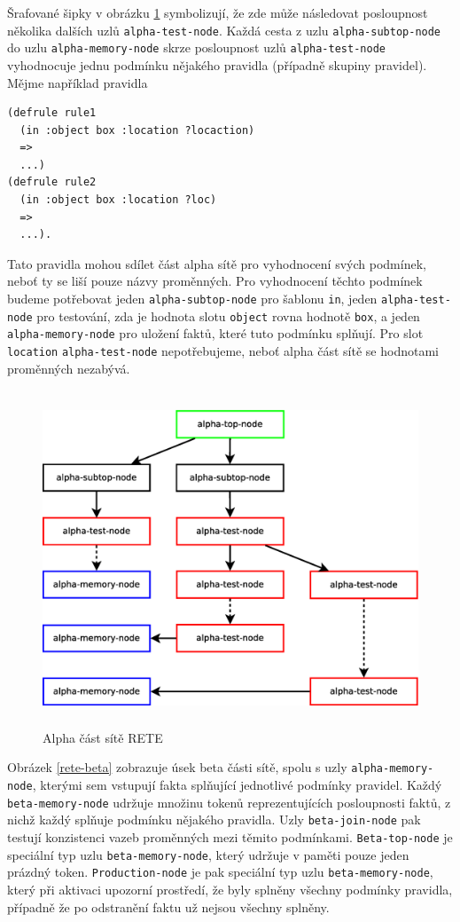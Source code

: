 Šrafované šipky v obrázku \ref{rete-alpha} symbolizují, že zde může následovat
posloupnost několika dalších uzlů \verb|alpha-test-node|. Každá cesta z
uzlu \verb|alpha-subtop-node| do uzlu \verb|alpha-memory-node| skrze posloupnost
uzlů \verb|alpha-test-node| vyhodnocuje jednu podmínku nějakého pravidla (případně
skupiny pravidel). Mějme například pravidla
\begin{verbatim}
(defrule rule1
  (in :object box :location ?locaction)
  =>
  ...)
(defrule rule2
  (in :object box :location ?loc)
  =>
  ...).
\end{verbatim}
Tato pravidla mohou sdílet část alpha sítě pro vyhodnocení svých podmínek, neboť
ty se liší pouze názvy proměnných. Pro vyhodnocení těchto podmínek budeme
potřebovat jeden \verb|alpha-subtop-node| pro šablonu \verb|in|, jeden
\verb|alpha-test-node| pro testování, zda je hodnota slotu \verb|object| rovna
hodnotě \verb|box|, a jeden \verb|alpha-memory-node| pro uložení faktů, které
tuto podmínku splňují. Pro slot \verb|location| \verb|alpha-test-node|
nepotřebujeme, neboť alpha část sítě se hodnotami proměnných nezabývá.

\begin{figure}[h]
\centering
\includegraphics[height=10cm]{rete-alpha.eps}
\caption{Alpha část sítě RETE}
\label{rete-alpha}
\end{figure}

Obrázek \ref{rete-beta} zobrazuje úsek beta části sítě, spolu s uzly
\verb|alpha-memory-node|, kterými sem vstupují fakta splňující jednotlivé
podmínky pravidel. Každý \verb|beta-memory-node| udržuje množinu tokenů
reprezentujících posloupnosti faktů, z nichž každý splňuje podmínku nějakého
pravidla. Uzly \verb|beta-join-node| pak testují konzistenci vazeb proměnných mezi
těmito podmínkami. \verb|Beta-top-node| je speciální typ uzlu
\verb|beta-memory-node|, který udržuje v paměti pouze jeden prázdný token.
\verb|Production-node| je pak speciální typ uzlu \verb|beta-memory-node|, který
při aktivaci upozorní prostředí, že byly splněny všechny podmínky pravidla,
případně že po odstranění faktu už nejsou všechny splněny.

